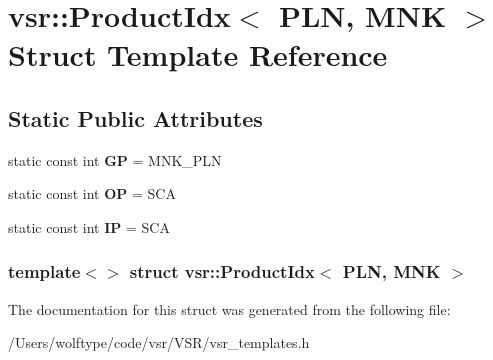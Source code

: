 \hypertarget{structvsr_1_1_product_idx_3_01_p_l_n_00_01_m_n_k_01_4}{\section{vsr\-:\-:Product\-Idx$<$ P\-L\-N, M\-N\-K $>$ Struct Template Reference}
\label{structvsr_1_1_product_idx_3_01_p_l_n_00_01_m_n_k_01_4}
}
\subsection*{Static Public Attributes}
\begin{DoxyCompactItemize}
\item 
\hypertarget{structvsr_1_1_product_idx_3_01_p_l_n_00_01_m_n_k_01_4_a98c80e1f8bfe5d1207915317035cab6d}{static const int {\bfseries G\-P} = M\-N\-K\-\_\-\-P\-L\-N}\label{structvsr_1_1_product_idx_3_01_p_l_n_00_01_m_n_k_01_4_a98c80e1f8bfe5d1207915317035cab6d}

\item 
\hypertarget{structvsr_1_1_product_idx_3_01_p_l_n_00_01_m_n_k_01_4_a4ca66eb3b74934c7577bfc32c4f73192}{static const int {\bfseries O\-P} = S\-C\-A}\label{structvsr_1_1_product_idx_3_01_p_l_n_00_01_m_n_k_01_4_a4ca66eb3b74934c7577bfc32c4f73192}

\item 
\hypertarget{structvsr_1_1_product_idx_3_01_p_l_n_00_01_m_n_k_01_4_a96581d85ecacbe6d1e2ce0a274fe2451}{static const int {\bfseries I\-P} = S\-C\-A}\label{structvsr_1_1_product_idx_3_01_p_l_n_00_01_m_n_k_01_4_a96581d85ecacbe6d1e2ce0a274fe2451}

\end{DoxyCompactItemize}
\subsubsection*{template$<$$>$ struct vsr\-::\-Product\-Idx$<$ P\-L\-N, M\-N\-K $>$}



The documentation for this struct was generated from the following file\-:\begin{DoxyCompactItemize}
\item 
/\-Users/wolftype/code/vsr/\-V\-S\-R/vsr\-\_\-templates.\-h\end{DoxyCompactItemize}
